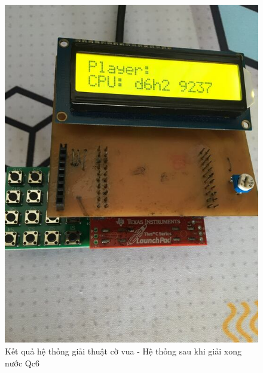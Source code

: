 \begin{figure}[ht]
\centering
\includegraphics[scale=0.4]{images/chess_wait_move2.jpg}
\caption{Kết quả hệ thống giải thuật cờ vua - Hệ thống sau khi giải xong nước Qc6}
\label{fig:chess_wait_move2}
\end{figure}

